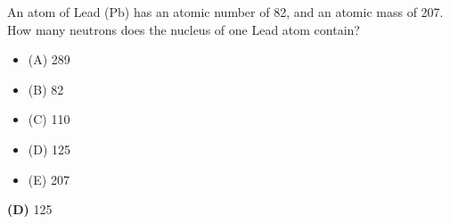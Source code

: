 

An atom of Lead (Pb) has an atomic number of 82, and an atomic mass of 207.  How many neutrons does the nucleus of one Lead atom contain?

\begin{itemize}
\item{(A)} 289
\vskip 5pt 
\item{(B)} 82
\vskip 5pt 
\item{(C)} 110
\vskip 5pt 
\item{(D)} 125
\vskip 5pt 
\item{(E)} 207
\end{itemize}







{\bf (D)} 125
 










